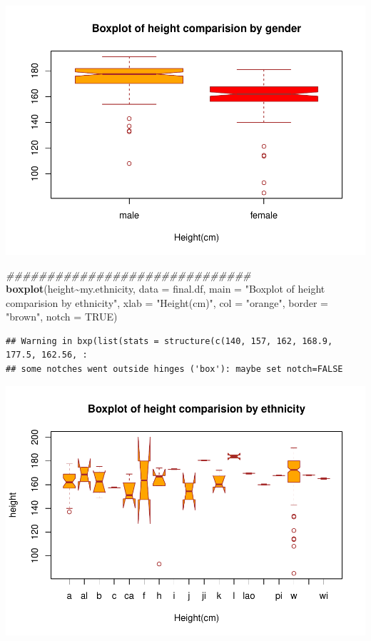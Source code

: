 \documentclass[]{article}
\newenvironment{Shaded}{\begin{snugshade}}{\end{snugshade}}
\newcommand{\CommentTok}[1]{\textcolor[rgb]{0.56,0.35,0.01}{\textit{#1}}}
\newcommand{\DataTypeTok}[1]{\textcolor[rgb]{0.13,0.29,0.53}{#1}}
\newcommand{\KeywordTok}[1]{\textcolor[rgb]{0.13,0.29,0.53}{\textbf{#1}}}
\newcommand{\NormalTok}[1]{#1}
\newcommand{\OperatorTok}[1]{\textcolor[rgb]{0.81,0.36,0.00}{\textbf{#1}}}
\newcommand{\OtherTok}[1]{\textcolor[rgb]{0.56,0.35,0.01}{#1}}
\newcommand{\StringTok}[1]{\textcolor[rgb]{0.31,0.60,0.02}{#1}}
\begin{document}
\includegraphics{project-measure_files/figure-latex/boxplots-1.pdf}

\begin{Shaded}
\begin{Highlighting}[]
\CommentTok{\#\#\#\#\#\#\#\#\#\#\#\#\#\#\#\#\#\#\#\#\#\#\#\#\#\#\#\#\#\#}
\KeywordTok{boxplot}\NormalTok{(height}\OperatorTok{\textasciitilde{}}\NormalTok{my.ethnicity,}
\DataTypeTok{data =}\NormalTok{ final.df,}
\DataTypeTok{main =} \StringTok{"Boxplot of height comparision by ethnicity"}\NormalTok{,}
\DataTypeTok{xlab =} \StringTok{"Height(cm)"}\NormalTok{,}
\DataTypeTok{col =} \StringTok{"orange"}\NormalTok{,}
\DataTypeTok{border =} \StringTok{"brown"}\NormalTok{,}
\DataTypeTok{notch =} \OtherTok{TRUE}\NormalTok{)}
\end{Highlighting}
\end{Shaded}

\begin{verbatim}
## Warning in bxp(list(stats = structure(c(140, 157, 162, 168.9, 177.5, 162.56, :
## some notches went outside hinges ('box'): maybe set notch=FALSE
\end{verbatim}

\includegraphics{project-measure_files/figure-latex/boxplots-2.pdf}
\end{document}
